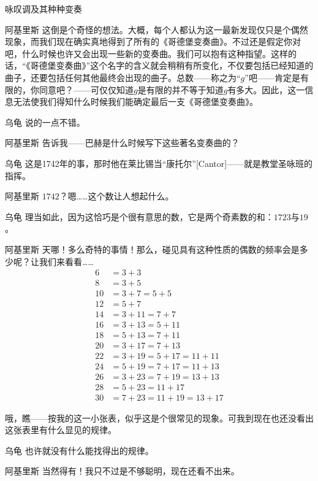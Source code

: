 \begin{dialog}{咏叹调及其种种变奏}
\begin{dialogue}
\item[阿基里斯]这倒是个奇怪的想法。大概，每个人都认为这一最新发现仅只是个偶然现象，而我们现在确实真地得到了所有的《哥德堡变奏曲》。不过还是假定你对吧，什么时候也许又会出现一些新的变奏曲。我们可以抱有这种指望。这样的话，“《哥德堡变奏曲》”这个名字的含义就会稍稍有所变化，不仅要包括已经知道的曲子，还要包括任何其他最终会出现的曲子。总数——称之为“$g$”吧——肯定是有限的，你同意吧？——可仅仅知道$g$是有限的并不等于知道$g$有多大。因此，这一信息无法使我们得知什么时候我们能确定最后一支《哥德堡变奏曲》。

\item[乌龟]说的一点不错。

\item[阿基里斯]告诉我——巴赫是什么时候写下这些著名变奏曲的？

\item[乌龟]这是1742年的事，那时他在莱比锡当“康托尔”[Cantor]——就是教堂圣咏班的指挥。

\item[阿基里斯]$1742$？嗯……这个数让人想起什么。

\item[乌龟]理当如此，因为这恰巧是个很有意思的数，它是两个奇素数的和：$1723$与$19$。

\item[阿基里斯]天哪！多么奇特的事情！那么，碰见具有这种性质的偶数的频率会是多少呢？让我们来看看……
\begin{align*}
   6 & =3+3 \\
   8 & =3+5 \\
  10 & =3+7=5+5 \\
  12 & =5+7 \\
  14 & =3+11=7+7 \\
  16 & =3+13=5+11 \\
  18 & =5+13=7+11 \\
  20 & =3+17=7+13 \\
  22 & =3+19=5+17=11+11 \\
  24 & =5+19=7+17=11+13 \\
  26 & =3+23=7+19=13+13 \\
  28 & =5+23=11+17 \\
  30 & =7+23=11+19=13+17
\end{align*}

哦，瞧——按我的这一小张表，似乎这是个很常见的现象。可我到现在也还没看出这张表里有什么显见的规律。

\item[乌龟]也许就没有什么能找得出的规律。

\item[阿基里斯]当然得有！我只不过是不够聪明，现在还看不出来。


\end{dialogue}
\end{dialog}
